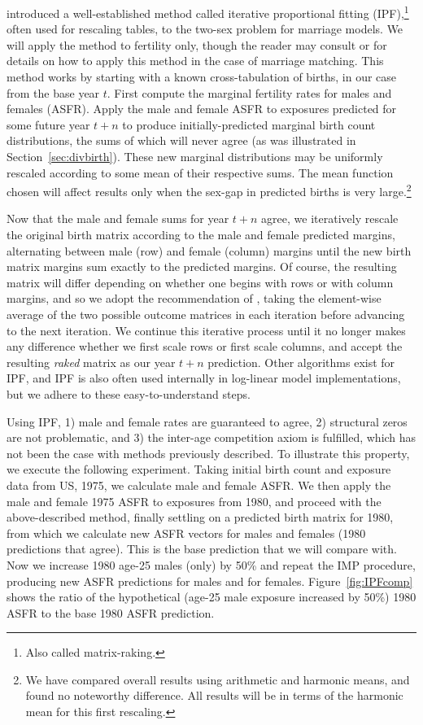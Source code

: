 \FloatBarrier
\label{sec:IPF}
\citet{mc1975models} introduced a well-established method called iterative
proportional fitting (IPF),\footnote{Also called matrix-raking.} often used for
rescaling tables, to the two-sex problem for marriage models. We will apply
the method to fertility only, though the reader may consult
\citet{mc1975models} or \citet{Matthews2013} for details on how to apply
this method in the case of marriage matching. This method works by starting with
a known cross-tabulation of births, in our case from the base year $t$. First compute 
the marginal fertility rates for males and females (ASFR). Apply the male and
female ASFR to exposures predicted for some future year $t+n$ to produce
initially-predicted marginal birth count distributions, the sums of which will 
never agree (as was illustrated in Section~\ref{sec:divbirth}). These new
marginal distributions may be uniformly rescaled according to some mean of their
respective sums. The mean function chosen will affect results only when the
sex-gap in predicted births is very large.\footnote{We have compared overall
results using arithmetic and harmonic means, and found no noteworthy difference. 
All results will be in terms of the harmonic mean for this first rescaling.}

Now that the male and female sums for year $t+n$ agree, we iteratively
rescale the original birth matrix according to the male and female
predicted margins, alternating between male (row) and female (column) margins
until the new birth matrix margins sum exactly to the predicted margins. Of
course, the resulting matrix will differ depending on whether one begins with
rows or with column margins, and so we adopt the recommendation of
\citet{Matthews2013}, taking the element-wise average of the two
possible outcome matrices in each iteration before advancing to the next
iteration. We continue this iterative process until it no longer makes any
difference whether we first scale rows or first scale columns, and accept the
resulting \textit{raked} matrix as our year $t+n$ prediction. Other algorithms
exist for IPF, and IPF is also often used internally in log-linear model
implementations, but we adhere to these easy-to-understand steps.

Using IPF, 1) male and female rates are guaranteed to agree, 2) structural zeros
are not problematic, and 3) the inter-age competition axiom is fulfilled,
which has not been the case with methods previously described. To illustrate
this property, we execute the following experiment. Taking initial birth count
and exposure data from US, 1975, we calculate male and female ASFR. We then
apply the male and female 1975 ASFR to exposures from 1980, and proceed with the
above-described method, finally settling on a predicted birth matrix for 1980,
from which we calculate new ASFR vectors for males and females (1980
predictions that agree). This is the base prediction that we will compare with.
Now we increase 1980 age-25 males (only) by 50\% and repeat the IMP procedure,
producing new ASFR predictions for males and for females.
Figure~\ref{fig:IPFcomp} shows the ratio of the hypothetical (age-25 male
exposure increased by 50\%) 1980 ASFR to the base 1980 ASFR prediction.

